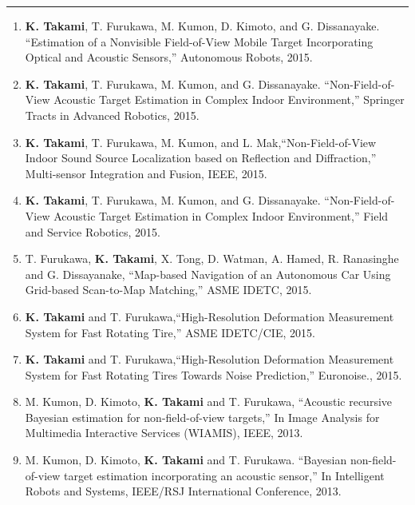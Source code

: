 \documentclass[11pt,letterpaper]{article}
\newcommand{\sect}[1]{\vspace{8mm}{\centering {\bf \large \scshape \uppercase{#1}} \par}  \vskip 2mm   {\color{blue} \hrule height 1pt}\vspace{2mm}}
\begin{document}
  \sect{publications}
  \begin{enumerate}
  \item {\bf K. Takami}, T. Furukawa, M. Kumon, D. Kimoto, and G. Dissanayake. ``Estimation of a Nonvisible Field-of-View Mobile Target Incorporating Optical and Acoustic Sensors,'' Autonomous Robots, 2015.

  \item {\bf K. Takami}, T. Furukawa, M. Kumon, and G. Dissanayake. ``Non-Field-of-View Acoustic Target Estimation in Complex Indoor Environment,'' Springer Tracts in Advanced Robotics, 2015.

  \item  {\bf K. Takami}, T. Furukawa, M. Kumon, and L. Mak,``Non-Field-of-View Indoor Sound Source Localization based on Reflection and Diffraction,'' Multi-sensor Integration and Fusion, IEEE, 2015.

  \item {\bf K. Takami}, T. Furukawa, M. Kumon, and G. Dissanayake. ``Non-Field-of-View Acoustic Target Estimation in Complex Indoor Environment,'' Field and Service Robotics, 2015.

  \item  T. Furukawa, {\bf K. Takami}, X. Tong, D. Watman, A. Hamed, R. Ranasinghe and G. Dissayanake, ``Map-based Navigation of an Autonomous Car Using Grid-based Scan-to-Map Matching,'' ASME IDETC, 2015.

  \item  {\bf K. Takami} and T. Furukawa,``High-Resolution Deformation Measurement System for Fast Rotating Tire,'' ASME IDETC/CIE, 2015.


  \item  {\bf K. Takami} and T. Furukawa,``High-Resolution Deformation Measurement System for Fast Rotating Tires Towards Noise Prediction,'' Euronoise., 2015.

  \item M. Kumon, D. Kimoto, {\bf K. Takami} and T. Furukawa, ``Acoustic recursive Bayesian estimation for non-field-of-view targets,'' In Image Analysis for Multimedia Interactive Services (WIAMIS), IEEE, 2013.

  \item M. Kumon, D. Kimoto, {\bf K. Takami} and T. Furukawa. ``Bayesian non-field-of-view target estimation incorporating an acoustic sensor,'' In Intelligent Robots and Systems, IEEE/RSJ International Conference, 2013.


\end{enumerate}
\end{document}
